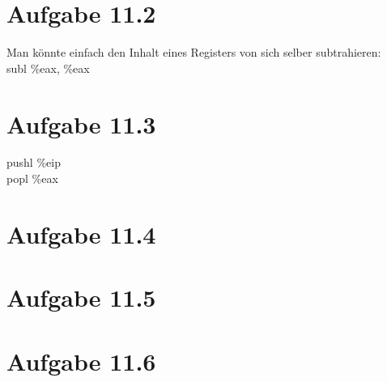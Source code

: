 \documentclass[12pt]{article}
\begin{document}
\section{Aufgabe 11.2}
Man könnte einfach den Inhalt eines Registers von sich selber subtrahieren: \\
subl \%eax, \%eax

\section{Aufgabe 11.3}
pushl \%eip \\
popl \%eax

\section{Aufgabe 11.4}

\section{Aufgabe 11.5}

\section{Aufgabe 11.6}
\end{document}

